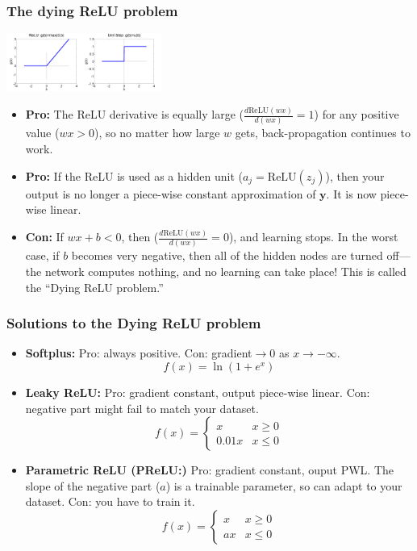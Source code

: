 \documentclass{beamer}
\begin{document}
\begin{frame}
  \frametitle{The dying ReLU problem}
  \centerline{\includegraphics[width=1in]{figs/nn_relu.png}\includegraphics[width=1in]{figs/nn_unitstep.png}}

  \begin{itemize}
    \item {\bf Pro:} The ReLU derivative is equally large
      ($\frac{d\mbox{ReLU}(wx)}{d(wx)}=1$) for any positive value
      ($wx>0$), so no matter how large $w$ gets, back-propagation
      continues to work.
    \item {\bf Pro:} If the ReLU is used as a hidden unit
      ($a_j=\mbox{ReLU}(z_j)$), then your output is no longer a
      piece-wise constant approximation of $\mathbf{y}$.  It is now
      piece-wise linear.
    \item {\bf Con:} If $wx+b<0$, then
      ($\frac{d\mbox{ReLU}(wx)}{d(wx)}=0$), and learning stops.
      In the worst case, if $b$ becomes very negative, then all of the
      hidden nodes are turned off---the network computes nothing, and
      no learning can take place!  This is called the ``Dying ReLU
      problem.''
  \end{itemize}
\end{frame}

\begin{frame}
  \frametitle{Solutions to the Dying ReLU problem}

  \begin{itemize}
  \item {\bf Softplus:}  Pro: always positive.  Con: gradient$\rightarrow 0$ as $x\rightarrow -\infty$.
    \[
    f(x) = \ln\left(1+e^x\right)
    \]
  \item {\bf Leaky ReLU:} Pro: gradient constant, output piece-wise linear.  Con:
    negative part might fail to match your dataset.
    \[
    f(x) = \begin{cases}
      x & x \ge 0\\
      0.01x & x \le 0
    \end{cases}
    \]
  \item {\bf Parametric ReLU (PReLU:)} Pro: gradient constant, ouput
    PWL.  The slope of the negative part ($a$) is a trainable
    parameter, so can adapt to your dataset.  Con: you have to train it.
    \[
    f(x) = \begin{cases}
      x & x \ge 0\\
      ax & x \le 0
    \end{cases}
    \]
  \end{itemize}
\end{frame}
\end{document}
